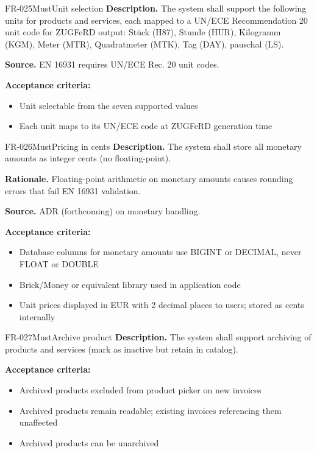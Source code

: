 \documentclass[11pt,a4paper]{article}
\begin{document}
\begin{requirement}{FR-025}{Must}{Unit selection}
\textbf{Description.} The system shall support the following units for products and services, each mapped to a UN/ECE Recommendation 20 unit code for ZUGFeRD output: St\"uck (H87), Stunde (HUR), Kilogramm (KGM), Meter (MTR), Quadratmeter (MTK), Tag (DAY), pauschal (LS).

\textbf{Source.} EN 16931 requires UN/ECE Rec. 20 unit codes.

\textbf{Acceptance criteria:}
\begin{itemize}
    \item Unit selectable from the seven supported values
    \item Each unit maps to its UN/ECE code at ZUGFeRD generation time
\end{itemize}
\end{requirement}

\begin{requirement}{FR-026}{Must}{Pricing in cents}
\textbf{Description.} The system shall store all monetary amounts as integer cents (no floating-point).

\textbf{Rationale.} Floating-point arithmetic on monetary amounts causes rounding errors that fail EN 16931 validation.

\textbf{Source.} ADR (forthcoming) on monetary handling.

\textbf{Acceptance criteria:}
\begin{itemize}
    \item Database columns for monetary amounts use BIGINT or DECIMAL, never FLOAT or DOUBLE
    \item Brick/Money or equivalent library used in application code
    \item Unit prices displayed in EUR with 2 decimal places to users; stored as cents internally
\end{itemize}
\end{requirement}

\begin{requirement}{FR-027}{Must}{Archive product}
\textbf{Description.} The system shall support archiving of products and services (mark as inactive but retain in catalog).

\textbf{Acceptance criteria:}
\begin{itemize}
    \item Archived products excluded from product picker on new invoices
    \item Archived products remain readable; existing invoices referencing them unaffected
    \item Archived products can be unarchived
\end{itemize}
\end{requirement}
\end{document}

